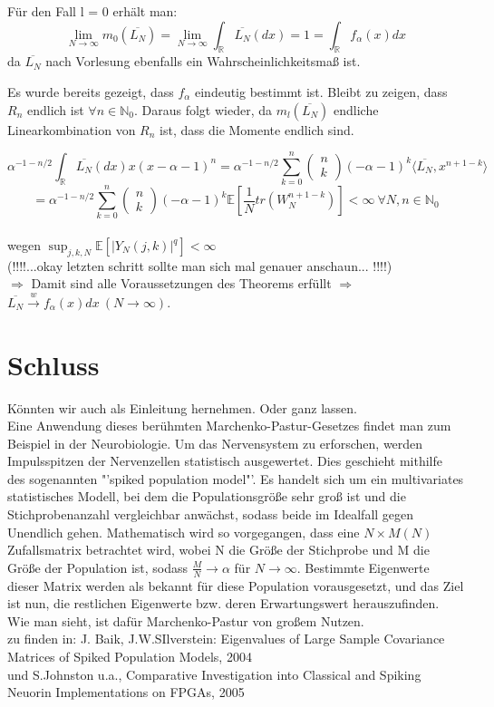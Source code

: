 \documentclass[a4paper, 11pt]{scrreprt}
\newcommand{\RR}{\mathbb{R}}
\newcommand{\EE}{\mathbb{E}}
\newcommand{\NN}{\mathbb{N}}
\begin{document}
Für den Fall l = 0 erhält man:
\[\lim_{N \to \infty} m_0(\overline{L_{N}}) 
= \lim_{N \to \infty} \int_\RR \overline{L_{N}}(dx) = 1 
= \int_\RR f_\alpha(x)dx\]
da $ \overline{L_N} $ nach Vorlesung ebenfalls ein Wahrscheinlichkeitsmaß ist.

Es wurde bereits gezeigt, dass $ f_\alpha $ eindeutig bestimmt ist. 
Bleibt zu zeigen, dass $ R_n $ endlich ist $ \forall n \in \NN_0 $. Daraus folgt wieder, da $ m_l(\overline{L_N}) $ endliche Linearkombination von $R_n$ ist, dass die Momente endlich sind.

 \[ \alpha^{-1-n/2} \int_{\RR}\overline{L_{N}}(dx)x(x-\alpha-1)^{n} = \alpha^{-1-n/2}\sum_{k=0}^n \begin{pmatrix} n\\k\end{pmatrix} (-\alpha -1)^k \langle \overline{L_N}, x^{n+1-k} \rangle \] 
\[= \alpha^{-1-n/2}\sum_{k=0}^n \begin{pmatrix} n\\k\end{pmatrix} (-\alpha -1)^k \EE [\dfrac{1}{N} tr(W_N^{n+1-k})]
< \infty ~\forall N,n \in \NN_0 \]\\
wegen $ \sup_{j,k,N} \EE[\vert Y_N(j,k)\vert ^{q}]< \infty$ \\
(!!!!...okay letzten schritt sollte man sich mal genauer anschaun... !!!!)\\
$ \Rightarrow $ Damit sind alle Voraussetzungen des Theorems erfüllt $ \Rightarrow $  $ \overline{L_N} \overset{w}{\rightarrow} f_\alpha (x)dx~(N \rightarrow \infty) $. \\



\section*{Schluss}
Könnten wir auch als Einleitung hernehmen. Oder ganz lassen.\\
Eine Anwendung dieses berühmten Marchenko-Pastur-Gesetzes findet man zum Beispiel in der Neurobiologie. Um das Nervensystem zu erforschen, werden Impulsspitzen der Nervenzellen statistisch ausgewertet. Dies geschieht mithilfe des sogenannten "'spiked population model"'. Es handelt sich um ein multivariates statistisches Modell, bei dem die Populationsgröße sehr groß ist und die Stichprobenanzahl vergleichbar anwächst, sodass beide im Idealfall gegen Unendlich gehen. Mathematisch wird so vorgegangen, dass eine $ N \times M(N) $ Zufallsmatrix betrachtet wird, wobei N die Größe der Stichprobe und M die Größe der Population ist, sodass $ \frac{M}{N} \rightarrow \alpha$ für $N \rightarrow \infty $. Bestimmte Eigenwerte dieser Matrix werden als bekannt für diese Population vorausgesetzt, und das Ziel ist nun, die restlichen Eigenwerte bzw. deren Erwartungswert herauszufinden. Wie man sieht, ist dafür Marchenko-Pastur von großem Nutzen.\\

zu finden in: J. Baik, J.W.SIlverstein: Eigenvalues of Large Sample Covariance Matrices of Spiked Population Models, 2004\\
und S.Johnston u.a., Comparative Investigation into Classical and Spiking Neuorin Implementations on FPGAs, 2005
\end{document}

